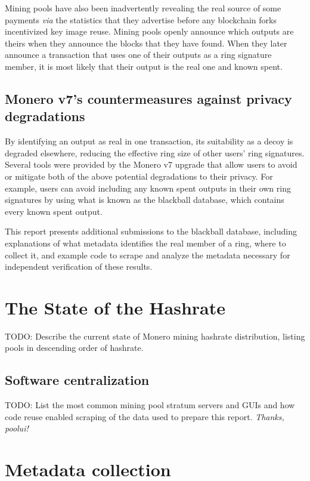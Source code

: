 \documentclass[notitlepage]{report}
\begin{document}
Mining pools have also been inadvertently revealing the real source of some payments \textit{via} the statistics that they advertise before any blockchain forks incentivized key image reuse.  Mining pools openly announce which outputs are theirs when they announce the blocks that they have found.  When they later announce a transaction that uses one of their outputs as a ring signature member, it is most likely that their output is the real one and known spent.

\subsection{Monero v7's countermeasures against privacy degradations}

By identifying an output as real in one transaction, its suitability as a decoy is degraded elsewhere, reducing the effective ring size of other users' ring signatures.  Several tools were provided by the Monero v7 upgrade that allow users to avoid or mitigate both of the above potential degradations to their privacy.  For example, users can avoid including any known spent outputs in their own ring signatures by using what is known as the blackball database, which contains every known spent output.

This report presents additional submissions to the blackball database, including explanations of what metadata identifies the real member of a ring, where to collect it, and example code to scrape and analyze the metadata necessary for independent verification of these results.

\section{The State of the Hashrate}

TODO: Describe the current state of Monero mining hashrate distribution, listing pools in descending order of hashrate.

\subsection{Software centralization}

TODO: List the most common mining pool stratum servers and GUIs and how code reuse enabled scraping of the data used to prepare this report.  \textit{Thanks, poolui!}

\section{Metadata collection}
\end{document}
